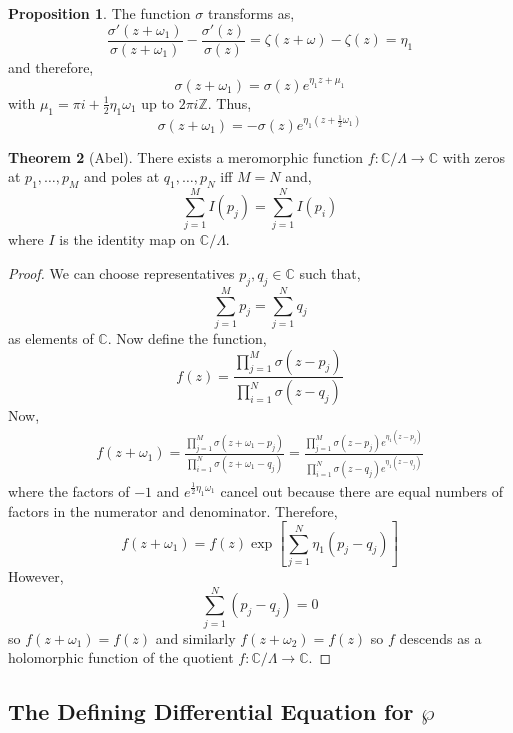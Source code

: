 \documentclass[12pt]{extarticle}
\newcommand{\Z}{\mathbb{Z}}
\newcommand{\C}{\mathbb{C}}
\theoremstyle{definition}
\newtheorem{theorem}{Theorem}[section]
\newtheorem{proposition}[theorem]{Proposition}
\begin{document}
\begin{proposition}
The function $\sigma$ transforms as,
\[ \frac{\sigma'(z + \omega_1)}{\sigma(z + \omega_1)} - \frac{\sigma'(z)}{\sigma(z)} = \zeta(z + \omega) - \zeta(z) = \eta_1 \]
and therefore,
\[ \sigma(z + \omega_1) = \sigma(z) e^{\eta_1 z + \mu_1} \]
with $\mu_1 = \pi i + \tfrac{1}{2} \eta_1 \omega_1$ up to $2 \pi i \Z$. Thus,
\[ \sigma(z + \omega_1) = - \sigma(z) e^{\eta_1(z + \frac{1}{2} \omega_1)} \] 
\end{proposition}

\begin{theorem}[Abel]
There exists a meromorphic function $f : \C / \Lambda \to \C$ with zeros at $p_1, \dots, p_M$ and poles at $q_1, \dots, p_N$ iff $M = N$ and,
\[ \sum_{j = 1}^M I(p_j) = \sum_{j = 1}^N I(p_i) \] 
where $I$ is the identity map on $\C / \Lambda$. 
\end{theorem}

\begin{proof}
We can choose representatives $p_j, q_j \in \C$ such that,
\[ \sum_{j = 1}^{M} p_j = \sum_{j = 1}^N q_j \]
as elements of $\C$. Now define the function,
\[ f(z) = \frac{\prod_{j = 1}^M \sigma(z - p_j)}{\prod_{i = 1}^N \sigma(z - q_j) } \]
Now,
\begin{align*}
f(z + \omega_1) = \frac{\prod_{j = 1}^M \sigma(z + \omega_1 - p_j)}{\prod_{i = 1}^N \sigma(z + \omega_1 - q_j) } = \frac{\prod_{j = 1}^M \sigma(z - p_j)e^{\eta_1(z - p_j)}}{\prod_{i = 1}^N \sigma(z - q_j) e^{\eta_1(z - q_j)}}
\end{align*} 
where the factors of $-1$ and $e^{\frac{1}{2} \eta_1 \omega_1}$ cancel out because there are equal numbers of factors in the numerator and denominator. Therefore,
\[ f(z + \omega_1) = f(z) \exp{\left[ \sum_{j = 1}^N \eta_1 (p_j - q_j) \right]} \]
However, 
\[ \sum_{j = 1}^N (p_j - q_j) = 0 \]
so $f(z + \omega_1) = f(z)$ and similarly $f(z + \omega_2) = f(z)$ so $f$ descends as a holomorphic function of the quotient $f : \C / \Lambda \to \C$.
\end{proof}

\subsection{The Defining Differential Equation for $\wp$}
\end{document}
